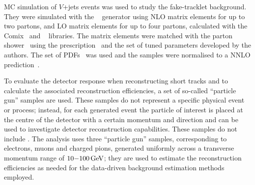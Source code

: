 MC simulation of $V$+\;\!jets events was used to study the fake-tracklet background. They were simulated with the \SHERPA[2.2.1]~\cite{Bothmann:2019yzt} generator using NLO matrix elements for up to two partons, and LO matrix elements for up to four partons, calculated with the Comix~\cite{Gleisberg:2008fv} and \OPENLOOPS~\cite{Buccioni:2019sur,Cascioli:2011va,Denner:2016kdg} libraries. The matrix elements were matched with the \SHERPA parton shower~\cite{Schumann:2007mg} using the \MEPSatNLO prescription~\cite{Hoeche:2011fd,Hoeche:2012yf,Catani:2001cc,Hoeche:2009rj} and the set of tuned parameters developed by the \SHERPA authors. The \NNPDF[3.0nnlo] set of PDFs~\cite{Ball:2014uwa} was used and the samples were normalised to a NNLO prediction~\cite{Anastasiou:2003ds}.

To evaluate the detector response when reconstructing short tracks and to calculate the associated reconstruction efficiencies, a set of so-called \enquote{particle gun} samples are used. These samples do not represent a specific physical event or process; instead, for each generated event the particle of interest is placed at the centre of the detector with a certain momentum and direction and can be used to investigate detector reconstruction capabilities. These samples do not include \pileup. The analysis uses three \enquote{particle gun} samples, corresponding to electrons, muons and charged pions, generated uniformly across a  transverse momentum range of $10{-}100\,\text{GeV}$; they are used to estimate the reconstruction efficiencies as needed for the data-driven background estimation methods employed. 


